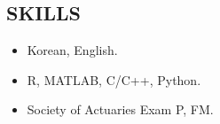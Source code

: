 \documentclass[margin, 10pt]{res} %
\begin{document}
\begin{resume}
\vspace{.2cm}



\section{\sf SKILLS} 
\begin{itemize} \itemsep -1pt
	\item{ Korean, English.}
	\item{ R, MATLAB, C/C++, Python.}
	\item{ Society of Actuaries Exam P, FM.}
\end{itemize}
\vspace{.2cm}




\end{resume}
\end{document}
